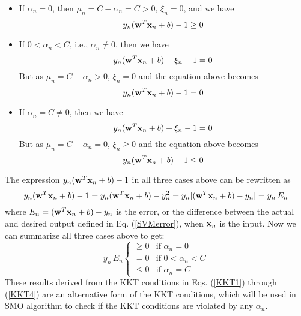 \documentclass{article}
\begin{document}
\begin{itemize}
\item If $\alpha_n=0$, then $\mu_n=C-\alpha_n=C>0$, $\xi_n=0$, and 
  we have
  \begin{equation}
  y_n({\bf w}^T{\bf x}_n+b)-1\ge 0
  \end{equation}
\item If $0<\alpha_n<C$, i.e., $\alpha_n\ne 0$, then we have
  \begin{equation}
  y_n({\bf w}^T{\bf x}_n+b)+\xi_n-1=0
  \end{equation}
  But as $\mu_n=C-\alpha_n>0$, $\xi_n=0$ and the equation above 
  becomes
  \begin{equation}
  y_n({\bf w}^T{\bf x}_n+b)-1=0
  \end{equation}
\item If $\alpha_n=C\ne 0$, then we have 
  \begin{equation}
  y_n({\bf w}^T{\bf x}_n+b)+\xi_n-1=0
  \end{equation}
  But as $\mu_n=C-\alpha_n=0$, $\xi_n\ge 0$ and the equation above
  becomes
  \begin{equation}
  y_n({\bf w}^T{\bf x}_n+b)-1\le 0
  \end{equation}
\end{itemize}
The expression $y_n({\bf w}^T{\bf x}_n+b)-1$ in all three cases
above can be rewritten as
\begin{equation}
  y_n({\bf w}^T{\bf x}_n+b)-1=y_n({\bf w}^T{\bf x}_n+b)-y_n^2
  =y_n[({\bf w}^T{\bf x}_n+b)-y_n]=y_n\,E_n
\end{equation}
where $E_n=({\bf w}^T{\bf x}_n+b)-y_n$ is the error, or the 
difference between the actual and desired output defined in 
Eq. (\ref{SVMerror}), when ${\bf x}_n$ is the input. Now we
can summarize all three cases above to get:
\begin{equation}
  y_n\,E_n \left\{\begin{array}{ll}\ge 0 & \mbox{if }\alpha_n=0\\
  = 0 & \mbox{if }0<\alpha_n<C\\\le 0 & \mbox{if }\alpha_n=C
  \end{array}\right.
  \label{KKTsoftmargin}
\end{equation}
These results derived from the KKT conditions in Eqs. (\ref{KKT1}) 
through (\ref{KKT4}) are an alternative form of the KKT conditions,
which will be used in SMO algorithm to check if the KKT conditions
are violated by any $\alpha_n$.
\end{document}
